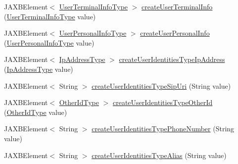 \begin{DoxyCompactItemize}
\item 
JAXBElement$<$ \hyperlink{classcom_1_1telefonica_1_1schemas_1_1unica_1_1rest_1_1directory_1_1v1_1_1UserTerminalInfoType}{UserTerminalInfoType} $>$ \hyperlink{classcom_1_1telefonica_1_1schemas_1_1unica_1_1rest_1_1directory_1_1v1_1_1ObjectFactory_a8e9c09609548d1f2c65ed93be8069c96}{createUserTerminalInfo} (\hyperlink{classcom_1_1telefonica_1_1schemas_1_1unica_1_1rest_1_1directory_1_1v1_1_1UserTerminalInfoType}{UserTerminalInfoType} value)
\item 
JAXBElement$<$ \hyperlink{classcom_1_1telefonica_1_1schemas_1_1unica_1_1rest_1_1directory_1_1v1_1_1UserPersonalInfoType}{UserPersonalInfoType} $>$ \hyperlink{classcom_1_1telefonica_1_1schemas_1_1unica_1_1rest_1_1directory_1_1v1_1_1ObjectFactory_a38907a29de5465bbfd780f1a2d10bbcd}{createUserPersonalInfo} (\hyperlink{classcom_1_1telefonica_1_1schemas_1_1unica_1_1rest_1_1directory_1_1v1_1_1UserPersonalInfoType}{UserPersonalInfoType} value)
\item 
JAXBElement$<$ \hyperlink{classcom_1_1telefonica_1_1schemas_1_1unica_1_1rest_1_1common_1_1v1_1_1IpAddressType}{IpAddressType} $>$ \hyperlink{classcom_1_1telefonica_1_1schemas_1_1unica_1_1rest_1_1directory_1_1v1_1_1ObjectFactory_a6ff5bb7ae2916d173c29495b7ba407d6}{createUserIdentitiesTypeIpAddress} (\hyperlink{classcom_1_1telefonica_1_1schemas_1_1unica_1_1rest_1_1common_1_1v1_1_1IpAddressType}{IpAddressType} value)
\item 
JAXBElement$<$ String $>$ \hyperlink{classcom_1_1telefonica_1_1schemas_1_1unica_1_1rest_1_1directory_1_1v1_1_1ObjectFactory_afe6c44534e6d68148a54eb559af3f811}{createUserIdentitiesTypeSipUri} (String value)
\item 
JAXBElement$<$ \hyperlink{classcom_1_1telefonica_1_1schemas_1_1unica_1_1rest_1_1common_1_1v1_1_1OtherIdType}{OtherIdType} $>$ \hyperlink{classcom_1_1telefonica_1_1schemas_1_1unica_1_1rest_1_1directory_1_1v1_1_1ObjectFactory_acf0c1e6df1be093e5df8227476a0619c}{createUserIdentitiesTypeOtherId} (\hyperlink{classcom_1_1telefonica_1_1schemas_1_1unica_1_1rest_1_1common_1_1v1_1_1OtherIdType}{OtherIdType} value)
\item 
JAXBElement$<$ String $>$ \hyperlink{classcom_1_1telefonica_1_1schemas_1_1unica_1_1rest_1_1directory_1_1v1_1_1ObjectFactory_a6ddd0fc74267a60f394355842ad046c7}{createUserIdentitiesTypePhoneNumber} (String value)
\item 
JAXBElement$<$ String $>$ \hyperlink{classcom_1_1telefonica_1_1schemas_1_1unica_1_1rest_1_1directory_1_1v1_1_1ObjectFactory_adf3edb2934ccbfd2a7007f8982c90682}{createUserIdentitiesTypeAlias} (String value)

\end{DoxyCompactItemize}
